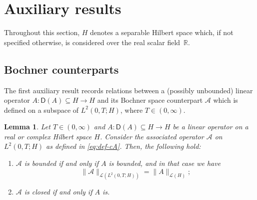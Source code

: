 \documentclass[reqno]{amsart}
\numberwithin{equation}{section}
\newcommand{\R}{\mathbb{R}}
\newcommand{\cA}{\mathcal{A}}
\newcommand{\norm}[2]{     \| #1       \|_{ #2 }}
\newcommand{\from}{\colon}
\newtheorem{lemma}{Lemma}[section]
\theoremstyle{remark}
\theoremstyle{definition}
\begin{document}

\appendix

\section{Auxiliary results}\label{app:auxiliary} 

Throughout this section, $H$ denotes a separable Hilbert space  
which, if not specified otherwise, is considered over the 
real scalar field~$\R$. 

\subsection{Bochner counterparts}\label{app:subsec:bochner-counterpart} 

The first auxiliary result records  
relations between 
a (possibly unbounded) linear operator 
$A\from\mathsf D(A)\subseteq H \to H$ 
and its Bochner space counterpart $\cA$ 
which is defined on a subspace 
of $L^2(0,T;H)$, where $T\in(0,\infty)$.  

\begin{lemma}\label{lem:Bochner-space-operator}
	Let $T\in(0,\infty)$ and 
	$A\from \mathsf D(A)\subseteq H\to H$ 
	be a linear operator on a real or complex 
	Hilbert space $H$.  
	Consider the associated operator 
	$\mathcal A$ on $L^2(0,T;H)$ 
	as defined in \eqref{eq:def-cA}.
	Then, the following hold: 
	\begin{enumerate}[leftmargin=1cm, label={\normalfont(\alph*)}]
		\item\label{lem:Bochner-space-operator-a} 
		$\mathcal A$ is bounded if and only if 
		$A$ is bounded, 
		and in that case we have 
		\[
		\norm{\mathcal A}{\mathscr L(L^2(0,T;H))} 
		= 
		\norm{A}{\mathscr L(H)} ;
		\]  
		\item\label{lem:Bochner-space-operator-b}
		$\mathcal A$ is closed if and only if $A$ is.
	\end{enumerate}
\end{lemma}
\end{document}
